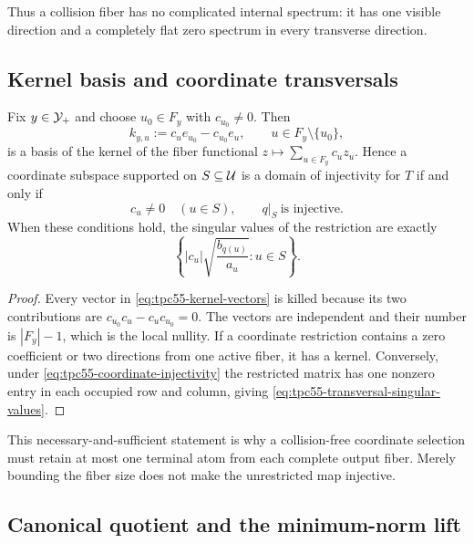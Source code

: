 Thus a collision fiber has no complicated internal spectrum: it has one
visible direction and a completely flat zero spectrum in every transverse
direction.

\subsection{Kernel basis and coordinate transversals}

\begin{proposition}
\label{prop:tpc55-kernel-basis}
Fix \(y\in\mathcal Y_+\) and choose \(u_0\in F_y\) with \(c_{u_0}\ne0\).  Then
\begin{equation}
 k_{y,u}:=c_ue_{u_0}-c_{u_0}e_u,
 \qquad u\in F_y\setminus\{u_0\},
 \label{eq:tpc55-kernel-vectors}
\end{equation}
is a basis of the kernel of the fiber functional
\(z\mapsto\sum_{u\in F_y}c_uz_u\).  Hence a coordinate subspace
supported on \(S\subseteq\mathcal U\) is a domain of injectivity for \(T\) if
and only if
\begin{equation}
 c_u\ne0\quad(u\in S),
 \qquad
 q|_S\ \text{is injective}.
 \label{eq:tpc55-coordinate-injectivity}
\end{equation}
When these conditions hold, the singular values of the restriction are
exactly
\begin{equation}
 \left\{
 |c_u|\sqrt{\frac{b_{q(u)}}{a_u}}:u\in S
 \right\}.
 \label{eq:tpc55-transversal-singular-values}
\end{equation}
\end{proposition}

\begin{proof}
Every vector in \eqref{eq:tpc55-kernel-vectors} is killed because its two
contributions are \(c_{u_0}c_u-c_uc_{u_0}=0\).  The vectors are independent
and their number is \(|F_y|-1\), which is the local nullity.  If a coordinate
restriction contains a zero coefficient or two directions from one active
fiber, it has a kernel.  Conversely, under \eqref{eq:tpc55-coordinate-injectivity}
the restricted matrix has one nonzero entry in each occupied row and column,
giving \eqref{eq:tpc55-transversal-singular-values}.
\end{proof}

This necessary-and-sufficient statement is why a collision-free coordinate
selection must retain at most one terminal atom from each complete output
fiber.  Merely bounding the fiber size does not make the unrestricted map
injective.

\subsection{Canonical quotient and the minimum-norm lift}

